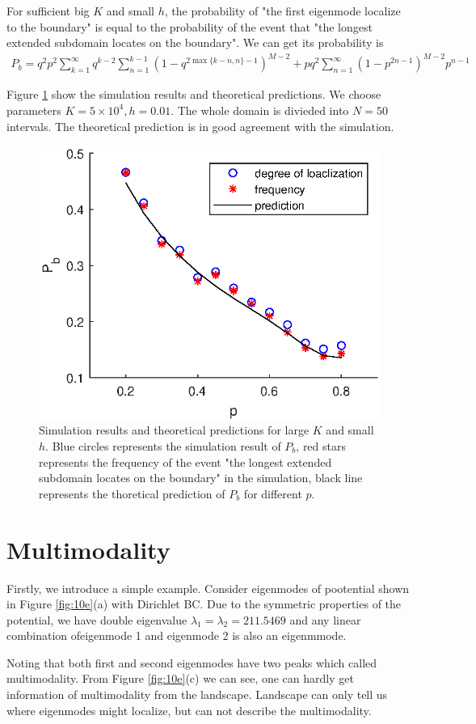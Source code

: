 \documentclass[12pt,a4paper]{article}
\begin{document}
For sufficient big $K$ and small $h$, the probability of "the first eigenmode localize to the boundary" is equal to the probability of the event that "the longest extended subdomain locates on the boundary". We can get its probability is
\begin{align}\label{eq:bdprob}
P_b = q^2 p^2 \sum_{k=1}^{\infty} q^{k-2} \sum_{n=1}^{k-1} (1 - q^{2 \max\{k-n,n\}-1})^{M-2} + p q^2 \sum_{n=1}^{\infty} (1 - p^{2 n-1})^{M-2} p^{n-1}
\end{align}

Figure \ref{fig:9} show the simulation results and theoretical predictions. We choose parameters $K = 5 \times 10^4, h = 0.01$. The whole domain is divieded into $N = 50$ intervals. The theoretical prediction is in good agreement with the simulation.
\begin{figure}[h]
\centering
\includegraphics[width=0.33\linewidth]{F9}
\caption{Simulation results and theoretical predictions for large $K$ and small $h$. Blue circles represents the simulation result of $P_b$, red stars represents the frequency of the event "the longest extended subdomain locates on the boundary" in the simulation, black line represents the thoretical prediction of $P_b$ for different $p$.}
\label{fig:9}
\end{figure}

\section{Multimodality}\label{sec:multimodality}

Firstly, we introduce a simple example. Consider eigenmodes of pootential shown in Figure \ref{fig:10e}(a) with Dirichlet BC. Due to the symmetric properties of the potential, we have double eigenvalue $\lambda_1 = \lambda_2 = 211.5469$ and any linear combination ofeigenmode 1 and eigenmode 2 is also an eigenmmode.

Noting that both first and second eigenmodes have two peaks which called multimodality. From Figure \ref{fig:10e}(c) we can see, one can hardly get information of multimodality from the landscape. Landscape can only tell us where eigenmodes might localize, but can not describe the multimodality.
\end{document}
